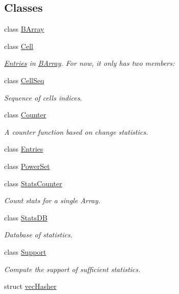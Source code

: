 \subsection*{Classes}
\begin{DoxyCompactItemize}
\item 
class \hyperlink{classbarray_1_1_b_array}{B\+Array}
\item 
class \hyperlink{classbarray_1_1_cell}{Cell}
\begin{DoxyCompactList}\small\item\em \hyperlink{classbarray_1_1_entries}{Entries} in \hyperlink{classbarray_1_1_b_array}{B\+Array}. For now, it only has two members\+: \end{DoxyCompactList}\item 
class \hyperlink{classbarray_1_1_cell_seq}{Cell\+Seq}
\begin{DoxyCompactList}\small\item\em Sequence of cells indices. \end{DoxyCompactList}\item 
class \hyperlink{classbarray_1_1_counter}{Counter}
\begin{DoxyCompactList}\small\item\em A counter function based on change statistics. \end{DoxyCompactList}\item 
class \hyperlink{classbarray_1_1_entries}{Entries}
\item 
class \hyperlink{classbarray_1_1_power_set}{Power\+Set}
\item 
class \hyperlink{classbarray_1_1_stats_counter}{Stats\+Counter}
\begin{DoxyCompactList}\small\item\em Count stats for a single Array. \end{DoxyCompactList}\item 
class \hyperlink{classbarray_1_1_stats_d_b}{Stats\+DB}
\begin{DoxyCompactList}\small\item\em Database of statistics. \end{DoxyCompactList}\item 
class \hyperlink{classbarray_1_1_support}{Support}
\begin{DoxyCompactList}\small\item\em Compute the support of sufficient statistics. \end{DoxyCompactList}\item 
struct \hyperlink{structbarray_1_1vec_hasher}{vec\+Hasher}
\end{DoxyCompactItemize}
